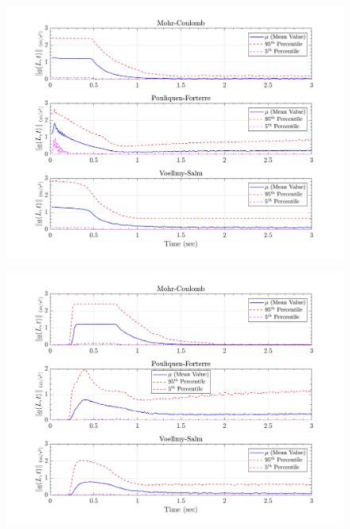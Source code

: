 \documentclass{article}
\begin{document}
\begin{figure}[H]
	\begin{minipage}[b]{0.5\linewidth}
    	\centering
    	\includegraphics[width=1\textwidth]{InclinedPlane/LocalRecords/Records/accel_L1.png}
    	\label{fig:Ramp-L1-Acc}
	\end{minipage}
	\begin{minipage}[b]{0.5\linewidth}
		\centering
		\includegraphics[width=1\textwidth]{InclinedPlane/LocalRecords/Records/accel_L8.png}
    	\label{fig:Ramp-L2-Acc}
    \end{minipage}


\end{figure}
\end{document}
